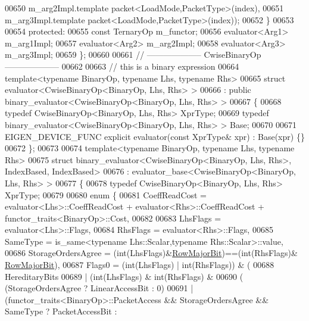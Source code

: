 \begin{DoxyCode}
00650                               m\_arg2Impl.template packet<LoadMode,PacketType>(index),
00651                               m\_arg3Impl.template packet<LoadMode,PacketType>(index));
00652   \}
00653 
00654 \textcolor{keyword}{protected}:
00655   \textcolor{keyword}{const} TernaryOp m\_functor;
00656   evaluator<Arg1> m\_arg1Impl;
00657   evaluator<Arg2> m\_arg2Impl;
00658   evaluator<Arg3> m\_arg3Impl;
00659 \};
00660 
00661 \textcolor{comment}{// -------------------- CwiseBinaryOp --------------------}
00662 
00663 \textcolor{comment}{// this is a binary expression}
00664 \textcolor{keyword}{template}<\textcolor{keyword}{typename} BinaryOp, \textcolor{keyword}{typename} Lhs, \textcolor{keyword}{typename} Rhs>
00665 \textcolor{keyword}{struct }evaluator<CwiseBinaryOp<BinaryOp, Lhs, Rhs> >
00666   : \textcolor{keyword}{public} binary\_evaluator<CwiseBinaryOp<BinaryOp, Lhs, Rhs> >
00667 \{
00668   \textcolor{keyword}{typedef} CwiseBinaryOp<BinaryOp, Lhs, Rhs> XprType;
00669   \textcolor{keyword}{typedef} binary\_evaluator<CwiseBinaryOp<BinaryOp, Lhs, Rhs> > Base;
00670   
00671   EIGEN\_DEVICE\_FUNC \textcolor{keyword}{explicit} evaluator(\textcolor{keyword}{const} XprType& xpr) : Base(xpr) \{\}
00672 \};
00673 
00674 \textcolor{keyword}{template}<\textcolor{keyword}{typename} BinaryOp, \textcolor{keyword}{typename} Lhs, \textcolor{keyword}{typename} Rhs>
00675 \textcolor{keyword}{struct }binary\_evaluator<CwiseBinaryOp<BinaryOp, Lhs, Rhs>, IndexBased, IndexBased>
00676   : evaluator\_base<CwiseBinaryOp<BinaryOp, Lhs, Rhs> >
00677 \{
00678   \textcolor{keyword}{typedef} CwiseBinaryOp<BinaryOp, Lhs, Rhs> XprType;
00679   
00680   \textcolor{keyword}{enum} \{
00681     CoeffReadCost = evaluator<Lhs>::CoeffReadCost + evaluator<Rhs>::CoeffReadCost + 
      functor\_traits<BinaryOp>::Cost,
00682     
00683     LhsFlags = evaluator<Lhs>::Flags,
00684     RhsFlags = evaluator<Rhs>::Flags,
00685     SameType = is\_same<typename Lhs::Scalar,typename Rhs::Scalar>::value,
00686     StorageOrdersAgree = (int(LhsFlags)&\hyperlink{group__flags_gae4f56c2a60bbe4bd2e44c5b19cbe8762}{RowMajorBit})==(\textcolor{keywordtype}{int}(RhsFlags)&
      \hyperlink{group__flags_gae4f56c2a60bbe4bd2e44c5b19cbe8762}{RowMajorBit}),
00687     Flags0 = (\textcolor{keywordtype}{int}(LhsFlags) | int(RhsFlags)) & (
00688         HereditaryBits
00689       | (\textcolor{keywordtype}{int}(LhsFlags) & \textcolor{keywordtype}{int}(RhsFlags) &
00690            ( (StorageOrdersAgree ? LinearAccessBit : 0)
00691            | (functor\_traits<BinaryOp>::PacketAccess && StorageOrdersAgree && SameType ? PacketAccessBit : 

\end{DoxyCode}
